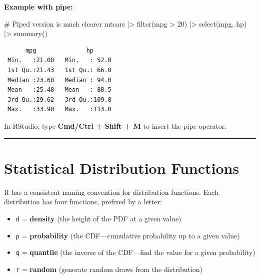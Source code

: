 \documentclass[
  letterpaper,
  DIV=11,
  numbers=noendperiod]{scrreprt}
\newenvironment{Shaded}{\begin{snugshade}}{\end{snugshade}}
\newcommand{\CommentTok}[1]{\textcolor[rgb]{0.37,0.37,0.37}{#1}}
\newcommand{\DecValTok}[1]{\textcolor[rgb]{0.68,0.00,0.00}{#1}}
\newcommand{\FunctionTok}[1]{\textcolor[rgb]{0.28,0.35,0.67}{#1}}
\newcommand{\NormalTok}[1]{\textcolor[rgb]{0.00,0.23,0.31}{#1}}
\newcommand{\SpecialCharTok}[1]{\textcolor[rgb]{0.37,0.37,0.37}{#1}}
\providecommand{\tightlist}{%
  \setlength{\itemsep}{0pt}\setlength{\parskip}{0pt}}
\begin{document}
\textbf{Example with pipe:}

\begin{Shaded}
\begin{Highlighting}[]
\CommentTok{\# Piped version is much clearer}
\NormalTok{mtcars }\SpecialCharTok{|\textgreater{}}
  \FunctionTok{filter}\NormalTok{(mpg }\SpecialCharTok{\textgreater{}} \DecValTok{20}\NormalTok{) }\SpecialCharTok{|\textgreater{}}
  \FunctionTok{select}\NormalTok{(mpg, hp) }\SpecialCharTok{|\textgreater{}}
  \FunctionTok{summary}\NormalTok{()}
\end{Highlighting}
\end{Shaded}

\begin{verbatim}
      mpg              hp       
 Min.   :21.00   Min.   : 52.0  
 1st Qu.:21.43   1st Qu.: 66.0  
 Median :23.60   Median : 94.0  
 Mean   :25.48   Mean   : 88.5  
 3rd Qu.:29.62   3rd Qu.:109.8  
 Max.   :33.90   Max.   :113.0  
\end{verbatim}

\begin{tcolorbox}[enhanced jigsaw, arc=.35mm, bottomrule=.15mm, bottomtitle=1mm, breakable, colback=white, colbacktitle=quarto-callout-tip-color!10!white, colframe=quarto-callout-tip-color-frame, coltitle=black, left=2mm, leftrule=.75mm, opacityback=0, opacitybacktitle=0.6, rightrule=.15mm, title=\textcolor{quarto-callout-tip-color}{\faLightbulb}\hspace{0.5em}{Keyboard Shortcut}, titlerule=0mm, toprule=.15mm, toptitle=1mm]

In RStudio, type \textbf{Cmd/Ctrl + Shift + M} to insert the pipe
operator.

\end{tcolorbox}

\begin{center}\rule{0.5\linewidth}{0.5pt}\end{center}

\section{Statistical Distribution
Functions}\label{statistical-distribution-functions}

R has a consistent naming convention for distribution functions. Each
distribution has four functions, prefixed by a letter:

\begin{itemize}
\tightlist
\item
  \texttt{d} = \textbf{density} (the height of the PDF at a given value)
\item
  \texttt{p} = \textbf{probability} (the CDF---cumulative probability up
  to a given value)
\item
  \texttt{q} = \textbf{quantile} (the inverse of the CDF---find the
  value for a given probability)
\item
  \texttt{r} = \textbf{random} (generate random draws from the
  distribution)
\end{itemize}
\end{document}
